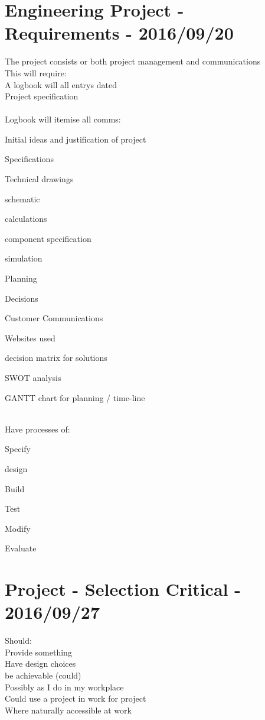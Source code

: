 \documentclass[a4paper]{article}
\begin{document}
\section{Engineering Project - Requirements - 2016/09/20}
The project consists or both project management and communications\\
This will require:\\
A logbook will all entrys dated\\
Project specification\\
\\
Logbook will itemise all comms:
\begin{itemize*}
  \item Initial ideas and justification of project
  \item Specifications
  \item Technical drawings
  \item schematic
  \item calculations
  \item component specification
  \item simulation
  \item Planning
  \item Decisions
  \item Customer Communications
  \item Websites used
  \item decision matrix for solutions
  \item SWOT analysis
  \item GANTT chart for planning / time-line
\end{itemize*}
\\
Have processes of:
\begin{itemize*}
  \item Specify
  \item design
  \item Build
  \item Test
  \item Modify
  \item Evaluate
\end{itemize*}

\section{Project - Selection Critical - 2016/09/27}
Should:\\
Provide something\\
Have design choices\\
be achievable (could)\\
Possibly as I do in my workplace\\
Could use a project in work for project\\
 Where naturally accessible at work\\
\end{document}
